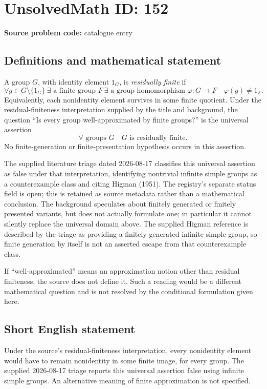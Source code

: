 \documentclass[11pt]{article}
\begin{document}
\section*{UnsolvedMath ID: 152}
\textbf{Source problem code:} catalogue entry
\subsection{Definitions and mathematical statement}
A group \(G\), with identity element \(1_G\), is \emph{residually finite} if
\[
\forall g\in G\setminus\{1_G\}\ \exists\text{ a finite group }F\ \exists\text{ a group homomorphism }\varphi:G\to F
\quad \varphi(g)\ne1_F.
\]
Equivalently, each nonidentity element survives in some finite quotient. Under the residual-finiteness interpretation supplied by the title and background, the question ``Is every group well-approximated by finite groups?'' is the universal assertion
\[
\forall\text{ groups }G\quad G\text{ is residually finite}.
\]
No finite-generation or finite-presentation hypothesis occurs in this assertion.

The supplied literature triage dated 2026-08-17 classifies this universal assertion as false under that interpretation, identifying nontrivial infinite simple groups as a counterexample class and citing Higman (1951). The registry's separate status field is open; this is retained as source metadata rather than a mathematical conclusion. The background speculates about finitely generated or finitely presented variants, but does not actually formulate one; in particular it cannot silently replace the universal domain above. The supplied Higman reference is described by the triage as providing a finitely generated infinite simple group, so finite generation by itself is not an asserted escape from that counterexample class.

If ``well-approximated'' means an approximation notion other than residual finiteness, the source does not define it. Such a reading would be a different mathematical question and is not resolved by the conditional formulation given here.
\subsection{Short English statement}
Under the source's residual-finiteness interpretation, every nonidentity element would have to remain nonidentity in some finite image, for every group. The supplied 2026-08-17 triage reports this universal assertion false using infinite simple groups. An alternative meaning of finite approximation is not specified.
\end{document}
